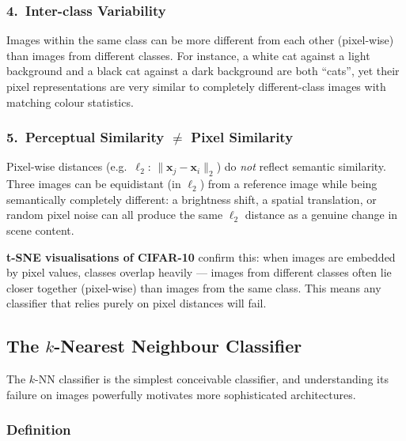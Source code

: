 \documentclass[11pt,a4paper]{article}
\begin{document}
\subsubsection{4.\ Inter-class Variability}

Images within the same class can be more different from each other (pixel-wise) than images
from different classes.  For instance, a white cat against a light background and a black cat
against a dark background are both ``cats'', yet their pixel representations are very similar
to completely different-class images with matching colour statistics.

\subsubsection{5.\ Perceptual Similarity $\neq$ Pixel Similarity}

\begin{warnbox}
Pixel-wise distances (e.g.\ $\ell_2$: $\|\mathbf{x}_j - \mathbf{x}_i\|_2$) do \emph{not} reflect
semantic similarity.  Three images can be equidistant (in $\ell_2$) from a reference image
while being semantically completely different: a brightness shift, a spatial translation, or random
pixel noise can all produce the same $\ell_2$ distance as a genuine change in scene content.

\textbf{t-SNE visualisations of CIFAR-10} confirm this: when images are embedded by pixel values,
classes overlap heavily — images from different classes often lie closer together (pixel-wise) than
images from the same class.  This means any classifier that relies purely on pixel distances will
fail.
\end{warnbox}

\subsection{The $k$-Nearest Neighbour Classifier}
\label{sec:knn}

The $k$-NN classifier is the simplest conceivable classifier, and understanding its failure on images
powerfully motivates more sophisticated architectures.

\subsubsection{Definition}
\end{document}

